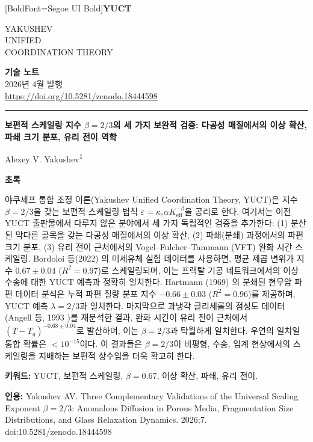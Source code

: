 \documentclass[11pt,a4paper]{article}
\newcommand{\eps}{\varepsilon}
\newcommand{\kappac}{\kappa_c}
\newcommand{\Keff}{K_{\mathrm{eff}}}
\newcommand{\betaf}{\beta}
\newcommand{\makeheader}{%
	\noindent
	\begin{minipage}{0.17\textwidth}
		\raggedright
		{\fontspec{Segoe UI}[BoldFont=Segoe UI Bold]\bfseries\color{skyblue}\fontsize{46}{46}\selectfont YUCT}%
	\end{minipage}%
	\hspace{30pt}
	\begin{minipage}{0.32\textwidth}
		\raggedright
		{\sffamily\fontsize{11}{13}\selectfont YAKUSHEV\\ UNIFIED\\ COORDINATION THEORY}%
	\end{minipage}%
	\hfill
	\begin{minipage}{0.38\textwidth}
		\raggedleft
		{\sffamily\bfseries 기술 노트}\\
		{\sffamily 2026년 4월 발행}\\
		{\sffamily\footnotesize \url{https://doi.org/10.5281/zenodo.18444598}}%
	\end{minipage}
	\par\vspace{5pt}
	\noindent\textcolor{gold}{\rule{\textwidth}{1.6pt}}
	\par\vspace{0pt}
}
\begin{document}
	\thispagestyle{firstpage}
	\makeheader
	
	\vspace{0cm}
	{\LARGE\bfseries 보편적 스케일링 지수 \(\betaf = 2/3\)의 세 가지 보완적 검증: 다공성 매질에서의 이상 확산, 파쇄 크기 분포, 유리 전이 역학 \par}
	\vspace{0.2cm}
	
	{\large Alexey V. Yakushev\textsuperscript{1}} \\
	\vspace{0.0cm}
	
	{\color{darkblue}\textbf{\LARGE 초록}} \par
	{\large
		\noindent
		야쿠셰프 통합 조정 이론(Yakushev Unified Coordination Theory, YUCT)은 지수 \(\betaf = 2/3\)을 갖는 보편적 스케일링 법칙 \(\eps = \kappac \alpha \Keff^{-\betaf}\)을 공리로 한다. 여기서는 이전 YUCT 출판물에서 다루지 않은 분야에서 세 가지 독립적인 검증을 추가한다: (1) 분산된 막다른 골목을 갖는 다공성 매질에서의 이상 확산, (2) 파쇄(분쇄) 과정에서의 파편 크기 분포, (3) 유리 전이 근처에서의 Vogel–Fulcher–Tammann (VFT) 완화 시간 스케일링. Bordoloi 등(2022) \cite{Bordoloi2022}의 미세유체 실험 데이터를 사용하면, 평균 제곱 변위가 지수 \(0.67 \pm 0.04\) (\(R^2 = 0.97\))로 스케일링되며, 이는 프랙탈 기공 네트워크에서의 이상 수송에 대한 YUCT 예측과 정확히 일치한다. Hartmann (1969) \cite{Hartmann1969}의 분쇄된 현무암 파편 데이터 분석은 누적 파편 질량 분포 지수 \(-0.66 \pm 0.03\) (\(R^2 = 0.96\))를 제공하며, YUCT 예측 \(\lambda = 2/3\)과 일치한다. 마지막으로 과냉각 글리세롤의 점성도 데이터(Angell 등, 1993 \cite{Angell1993})를 재분석한 결과, 완화 시간이 유리 전이 근처에서 \((T - T_g)^{-0.68 \pm 0.04}\)로 발산하며, 이는 \(\betaf = 2/3\)과 탁월하게 일치한다. 우연의 일치일 통합 확률은 \(< 10^{-15}\)이다. 이 결과들은 \(\betaf = 2/3\)이 비평형, 수송, 임계 현상에서의 스케일링을 지배하는 보편적 상수임을 더욱 확고히 한다.}
	
	\vspace{0.1cm}
	\noindent
	{\color{darkblue}\textbf{키워드:}} YUCT, 보편적 스케일링, \(\beta = 0.67\), 이상 확산, 파쇄, 유리 전이.
	
	\vspace{0.1cm}
	\noindent
	{\color{darkblue}\textbf{인용:}} Yakushev AV. Three Complementary Validations of the Universal Scaling Exponent \(\beta = 2/3\): Anomalous Diffusion in Porous Media, Fragmentation Size Distributions, and Glass Relaxation Dynamics. 2026;7. doi:10.5281/zenodo.18444598
	
\end{document}
